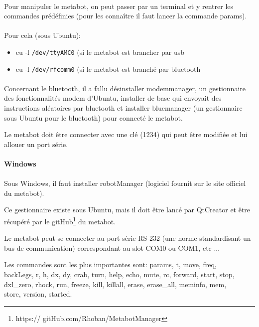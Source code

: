\documentclass[10pt,a4paper]{report}
\begin{document}
\paragraph{}
Pour manipuler le metabot, on peut passer par un terminal et y rentrer les commandes prédéfinies (pour les connaître il faut lancer la commande params).
\paragraph{}
Pour cela (sous Ubuntu): 
\begin{itemize}
\item cu -l \texttt{/dev/ttyAMC0} (si le metabot est brancher par usb
\item cu -l \texttt{/dev/rfcomm0} (si le metabot est branché par bluetooth
\end{itemize}
\paragraph{}
Concernant le bluetooth, il a fallu désinstaller modemmanager, un gestionnaire des fonctionnalités modem d'Ubuntu, installer de base qui envoyait des instructions aléatoires par bluetooth et installer bluemanager (un gestionnaire sous Ubuntu pour le bluetooth) pour connecté le metabot.

Le metabot doit être connecter avec une clé (1234) qui peut être modifiée et lui allouer un port série.
\paragraph{Windows}
\paragraph{}
Sous Windows, il faut installer robotManager (logiciel fournit sur le site officiel du metabot).

Ce gestionnaire existe sous Ubuntu, mais il doit être lancé par QtCreator et être récupéré par le  gitHub\footnote{https:// gitHub.com/Rhoban/MetabotManager} du metabot.

Le metabot peut se connecter au port série RS-232 (une norme standardisant un bus de communication) correspondant au slot COM0 ou COM1, etc ...

Les commandes sont les plus importantes sont: params,  t, move, freq, \\backLegs, r, h, dx, dy, crab, turn, help, echo, mute, rc, forward, start, stop,\\ dxl\_zero, rhock, run, freeze, kill, killall, erase, erase\_all, meminfo, mem, \\store, version, started.
\end{document}
